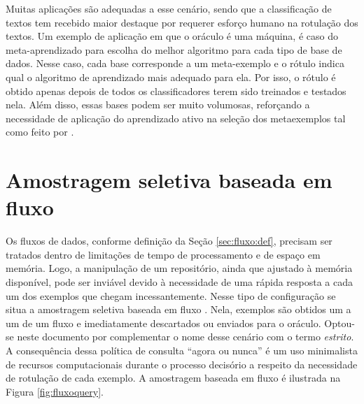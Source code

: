 %     

Muitas aplicações são adequadas a esse cenário, sendo que a classificação de textos
\citep{mccallum1998employing} tem recebido maior destaque por requerer esforço humano na
rotulação
dos textos.
Um exemplo de aplicação em que o oráculo é uma máquina, é caso do meta-aprendizado para escolha
do
melhor algoritmo para cada tipo de base de dados.
Nesse caso, cada base corresponde a um meta-exemplo e o rótulo indica qual o algoritmo de aprendizado mais
adequado para ela.
Por isso, o rótulo é obtido apenas depois de todos os classificadores terem sido treinados e
testados nela.
Além disso, essas bases podem ser muito volumosas, reforçando a necessidade de aplicação do
aprendizado ativo
na seleção dos metaexemplos tal como feito por \cite{prudencio2007active}.



\section*{Amostragem seletiva baseada em fluxo} \label{sec:cenario_fluxo}
Os fluxos de dados, conforme definição da Seção \ref{sec:fluxo:def}, precisam ser tratados dentro
de limitações de tempo de processamento e de espaço em memória.
Logo, a manipulação de um repositório, ainda que ajustado à memória disponível, pode ser inviável
devido à necessidade de uma rápida resposta a cada um dos exemplos que chegam incessantemente.
Nesse tipo de configuração se situa a amostragem seletiva baseada em fluxo
\citep{cohn1994improving}. %
Nela, exemplos são obtidos um a um de um fluxo e imediatamente descartados ou enviados para o
oráculo.
Optou-se neste documento por complementar o nome desse cenário com o termo \textit{estrito}.
A consequência dessa política de consulta ``agora ou nunca'' é um uso minimalista de recursos
computacionais durante o processo decisório a respeito da necessidade de rotulação de cada
exemplo.
A amostragem baseada em fluxo é ilustrada na Figura \ref{fig:fluxoquery}.

%     

